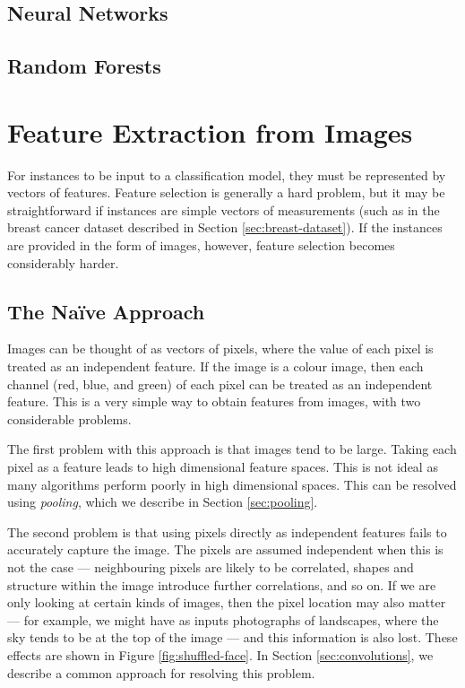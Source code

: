     \subsection{Neural Networks}
    \label{sec:neural-networks}


    \subsection{Random Forests}
    \label{sec:random-forests}


\section{Feature Extraction from Images}
\label{sec:image-features}
    
    For instances to be input to a classification model, they must be
    represented by vectors of features. Feature selection is generally a hard
    problem, but it may be straightforward if instances are simple vectors of
    measurements (such as in the breast cancer dataset described in Section
    \ref{sec:breast-dataset}). If the instances are provided in the form of
    images, however, feature selection becomes considerably harder.

    \subsection{The Na\"ive Approach}
    \label{sec:naive-approach-image-features}

        Images can be thought of as vectors of pixels, where the value of each
        pixel is treated as an independent feature. If the image is a colour
        image, then each channel (red, blue, and green) of each pixel can be
        treated as an independent feature. This is a very simple way to obtain
        features from images, with two considerable problems.

        The first problem with this approach is that images tend to be large.
        Taking each pixel as a feature leads to high dimensional feature spaces.
        This is not ideal as many algorithms perform poorly in high dimensional
        spaces. This can be resolved using \emph{pooling}, which we describe in
        Section \ref{sec:pooling}.

        The second problem is that using pixels directly as independent features
        fails to accurately capture the image. The pixels are assumed
        independent when this is not the case --- neighbouring pixels are likely
        to be correlated, shapes and structure within the image introduce
        further correlations, and so on. If we are only looking at certain kinds
        of images, then the pixel location may also matter --- for example, we
        might have as inputs photographs of landscapes, where the sky tends to
        be at the top of the image --- and this information is also lost. These
        effects are shown in Figure \ref{fig:shuffled-face}. In Section
        \ref{sec:convolutions}, we describe a common approach for resolving this
        problem.

